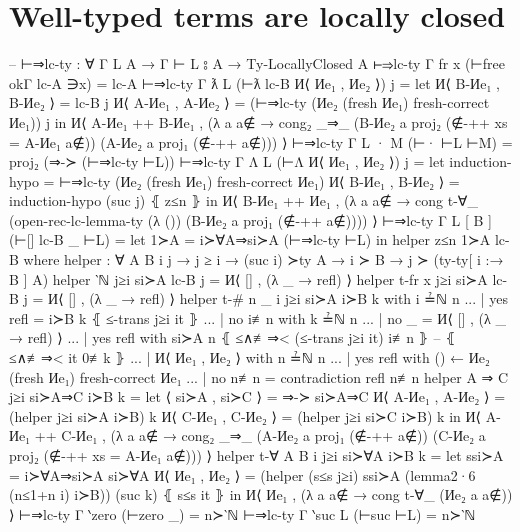\documentclass[logo,bsc,singlespacing,parskip,online]{infthesis}
\begin{document}
\section{Well-typed terms are locally closed}
\label{appendix:f_well_typed_lc}
\begin{code}
  -- ⊢⇒lc-ty : ∀ {Γ L A} → Γ ⊢ L ⦂ A → Ty-LocallyClosed A
  ⊢⇒lc-ty {Γ} {fr x} (⊢free okΓ lc-A ∋x) = lc-A
  ⊢⇒lc-ty {Γ} {ƛ L} (⊢ƛ lc-B И⟨ Иe₁ , Иe₂ ⟩) j =
    let И⟨ B-Иe₁ , B-Иe₂ ⟩ = lc-B j
        И⟨ A-Иe₁ , A-Иe₂ ⟩ =
          (⊢⇒lc-ty (Иe₂ (fresh Иe₁) {fresh-correct Иe₁})) j
    in И⟨ A-Иe₁ ++ B-Иe₁ , (λ a {a∉} → cong₂ _⇒_
      (B-Иe₂ a {proj₂ (∉-++ {xs = A-Иe₁} a∉)})
      (A-Иe₂ a {proj₁ (∉-++ a∉)})) ⟩
  ⊢⇒lc-ty {Γ} {L · M} (⊢· ⊢L ⊢M) = proj₂ (⇒-≻ (⊢⇒lc-ty ⊢L))
  ⊢⇒lc-ty {Γ} {Λ L} (⊢Λ И⟨ Иe₁ , Иe₂ ⟩) j =
    let induction-hypo = ⊢⇒lc-ty (Иe₂ (fresh Иe₁) {fresh-correct Иe₁})
        И⟨ B-Иe₁ , B-Иe₂ ⟩ = induction-hypo (suc j) ⦃ z≤n ⦄
    in И⟨ B-Иe₁ ++ Иe₁ , (λ a {a∉} → cong t-∀_
      (open-rec-lc-lemma-ty
        (λ ())
        (B-Иe₂ a {proj₁ (∉-++ a∉)}))) ⟩
  ⊢⇒lc-ty {Γ} {L [ B ]} (⊢[] lc-B _ ⊢L) =
    let 1≻A = i≻∀A⇒si≻A (⊢⇒lc-ty ⊢L)
    in helper z≤n 1≻A lc-B
    where
      helper : ∀ {A B i j}
        → j ≥ i
        → (suc i) ≻ty A
        → i ≻ B → j ≻ (ty-ty[ i :→ B ] A)
      helper {‵ℕ} j≥i si≻A lc-B j = И⟨ [] , (λ _ → refl) ⟩
      helper {t-fr x} j≥i si≻A lc-B j = И⟨ [] , (λ _ → refl) ⟩
      helper {t-# n} {_} {i} j≥i si≻A i≻B k with i ≟ℕ n
      ... | yes refl = i≻B k ⦃ ≤-trans j≥i it ⦄
      ... | no  i≢n  with k ≟ℕ n
      ...   | no  _    = И⟨ [] , (λ _ → refl) ⟩
      ...   | yes refl with si≻A n ⦃ ≤∧≢⇒< (≤-trans j≥i it) i≢n ⦄ -- ⦃ ≤∧≢⇒< it 0≢k ⦄
      ...     | И⟨ Иe₁ , Иe₂ ⟩ with n ≟ℕ n
      ...       | yes refl with () ← Иe₂ (fresh Иe₁) {fresh-correct Иe₁}
      ...       | no  n≢n =  contradiction refl n≢n
      helper {A ⇒ C} j≥i si≻A⇒C i≻B k =
        let ⟨ si≻A , si≻C ⟩ = ⇒-≻ si≻A⇒C
            И⟨ A-Иe₁ , A-Иe₂ ⟩ = (helper j≥i si≻A i≻B) k
            И⟨ C-Иe₁ , C-Иe₂ ⟩ = (helper j≥i si≻C i≻B) k
        in И⟨ A-Иe₁ ++ C-Иe₁ , (λ a {a∉} → cong₂ _⇒_
          (A-Иe₂ a {proj₁ (∉-++ a∉)})
          (C-Иe₂ a {proj₂ (∉-++ {xs = A-Иe₁} a∉)})) ⟩
      helper {t-∀ A} {B} {i} j≥i si≻∀A i≻B k =
        let ssi≻A = i≻∀A⇒si≻A si≻∀A
            И⟨ Иe₁ , Иe₂ ⟩ = (helper (s≤s j≥i) ssi≻A (lemma2·6 (n≤1+n i) i≻B)) (suc k) ⦃ s≤s it ⦄
        in И⟨ Иe₁ , (λ a {a∉} → cong t-∀_ (Иe₂ a {a∉})) ⟩
  ⊢⇒lc-ty {Γ} {‵zero} (⊢zero _) = n≻‵ℕ
  ⊢⇒lc-ty {Γ} {‵suc L} (⊢suc ⊢L) = n≻‵ℕ


\end{code}
\end{document}
